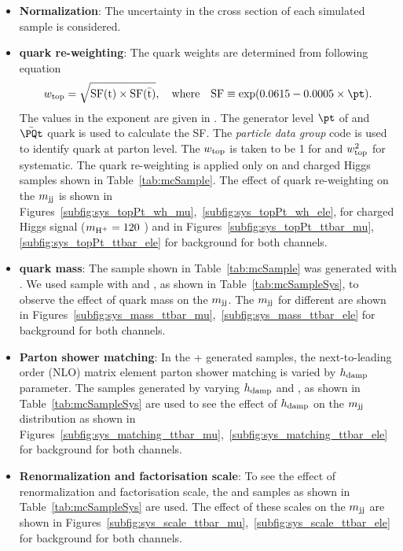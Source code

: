 \begin{itemize}[leftmargin=*]
\item {\bf {Normalization}}: The uncertainty in the cross section of each simulated sample is 
	considered. 

\item {\bf {\PQt quark \pt re-weighting}}: The \PQt quark \pt weights are determined from 
	following equation
    \begin{equation}
    w_{\rm{top}}=\sqrt{\rm{SF(t)}\times \rm{SF}(\bar{\rm{t}})}, \quad\rm {where}\quad \rm{SF}\equiv\exp(0.0615 - 0.0005\times\pt).
    \label{eq:top_wt}
    \end{equation}
    The values in the exponent are given in \cite{CMS-PAS-TOP-16-011, CMS-PAS-TOP-16-008}.
    The generator level $\pt$ of \PQt and $\bar{\PQt}$ quark is used to calculate the SF. 
    The \textit{particle data group} code  is used to identify \PQt quark at parton level. 
	The $w_{\rm{top}}$ is taken 
	to be 1 for  and $w_{\rm{top}}^2$ for  systematic. The \PQt quark \pt re-weighting 
	is applied only on \ttjets and charged Higgs samples shown in Table~\ref{tab:mcSample}. The 
	effect of \PQt quark \pt re-weighting on the $\mjj$ is shown in 
	Figures~\ref{subfig:sys_topPt_wh_mu},~\ref{subfig:sys_topPt_wh_ele}, for charged Higgs 
	signal ($\mHp = 120$ \GeV) and in Figures~\ref{subfig:sys_topPt_ttbar_mu}, 
	\ref{subfig:sys_topPt_ttbar_ele} for \ttjets background for both channels. 
\item {\bf {\PQt quark mass}}: The \ttjets sample shown in Table~\ref{tab:mcSample} was 
    generated with  \GeV. We used \ttjets sample with  
    \GeV and  \GeV, as shown in Table~\ref{tab:mcSampleSys}, to observe the 
    effect of \PQt quark mass on the $\mjj$. The $\mjj$ for different \mt are shown  
    in Figures~\ref{subfig:sys_mass_ttbar_mu},~\ref{subfig:sys_mass_ttbar_ele}
    for \ttjets background for both channels. 

\item {\bf {Parton shower matching}}: In the \POWHEG + \PYTHIA generated samples, the 
    next-to-leading order (NLO) matrix element parton shower matching is varied by $h_{\rm {damp}}$
    parameter. The \ttjets samples generated by varying $h_{\rm{damp}}$  and 
    , as shown in Table~\ref{tab:mcSampleSys} are used to see the effect of $h_{\rm{damp}}$ 
    on the $\mjj$ distribution as shown  
    in Figures~\ref{subfig:sys_matching_ttbar_mu},~\ref{subfig:sys_matching_ttbar_ele}
    for \ttjets background for both channels. 

\item {\bf {Renormalization and factorisation scale}}: To see the effect of renormalization and 
	factorisation scale, the  and  \ttjets samples as shown in 
	Table~\ref{tab:mcSampleSys} are used. The effect of these scales on the $\mjj$ are shown 
    	in Figures~\ref{subfig:sys_scale_ttbar_mu},~\ref{subfig:sys_scale_ttbar_ele} 
	for \ttjets background for both channels. 
\end{itemize}
